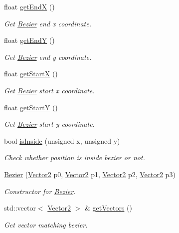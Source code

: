 \begin{DoxyCompactItemize}
float \mbox{\hyperlink{classBezier_aef4b9fbe3b5d30ea6b42de7fc38cf796}{get\+EndX}} ()
\begin{DoxyCompactList}\small\item\em Get \mbox{\hyperlink{classBezier}{Bezier}} end x coordinate. \end{DoxyCompactList}\item 
float \mbox{\hyperlink{classBezier_abb9094c95311d916aad946d90a9b5c12}{get\+EndY}} ()
\begin{DoxyCompactList}\small\item\em Get \mbox{\hyperlink{classBezier}{Bezier}} end y coordinate. \end{DoxyCompactList}\item 
float \mbox{\hyperlink{classBezier_a81efbcfa1f2bc8bf3c539dba1a4b80e0}{get\+StartX}} ()
\begin{DoxyCompactList}\small\item\em Get \mbox{\hyperlink{classBezier}{Bezier}} start x coordinate. \end{DoxyCompactList}\item 
float \mbox{\hyperlink{classBezier_ae310b53e4d8b3d586bbc4d335ac4cc08}{get\+StartY}} ()
\begin{DoxyCompactList}\small\item\em Get \mbox{\hyperlink{classBezier}{Bezier}} start y coordinate. \end{DoxyCompactList}\item 
bool \mbox{\hyperlink{classBezier_a1ea801d6578a5858939b87775a9ea654}{is\+Inside}} (unsigned x, unsigned y)
\begin{DoxyCompactList}\small\item\em Check whether position is inside bezier or not. \end{DoxyCompactList}\item 
\mbox{\hyperlink{classBezier_aeee0e41ed64d1a61d7ac103d2300093b}{Bezier}} (\mbox{\hyperlink{classVector2}{Vector2}} p0, \mbox{\hyperlink{classVector2}{Vector2}} p1, \mbox{\hyperlink{classVector2}{Vector2}} p2, \mbox{\hyperlink{classVector2}{Vector2}} p3)
\begin{DoxyCompactList}\small\item\em Constructor for \mbox{\hyperlink{classBezier}{Bezier}}. \end{DoxyCompactList}\item 
std\+::vector$<$ \mbox{\hyperlink{classVector2}{Vector2}} $>$ \& \mbox{\hyperlink{classBezier_a26bf332b0c831e0f302f1d72ec782436}{get\+Vectors}} ()
\begin{DoxyCompactList}\small\item\em Get vector matching bezier. \end{DoxyCompactList}\end{DoxyCompactItemize}


